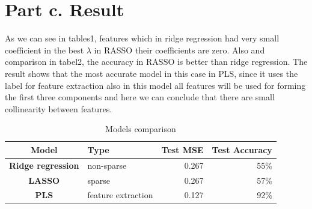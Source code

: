 \documentclass[a4paper, 11pt]{article}
\begin{document}
\section*{Part c. Result }
As we can see in tables1, features which in ridge regression had very small coefficient in the best $\lambda$ in RASSO their coefficients are zero. Also and comparison in tabel2, the accuracy in RASSO is better than ridge regression. The result shows that the most accurate model in this case in PLS, since it uses the label for feature extraction also in this model all features will be used for forming the first three components and here we can conclude that there are small collinearity between features.
 
\begin{table}[ht]
	\centering
	\caption{Models comparison}
	\label{table2}
	\begin{tabular}{clrr}
		\hline
		\textbf{Model} & \textbf{Type} & \textbf{Test MSE} & \textbf{Test Accuracy} \\ 
		\hline
		\textbf{Ridge regression}  & non-sparse & 0.267 & 55\% \\ 
		\textbf{LASSO} & sparse & 0.267 & 57\% \\ 
		\textbf{PLS}   & feature extraction & 0.127 & 92\% \\   
		\hline
	\end{tabular}
\end{table}
\newpage


\end{document}

